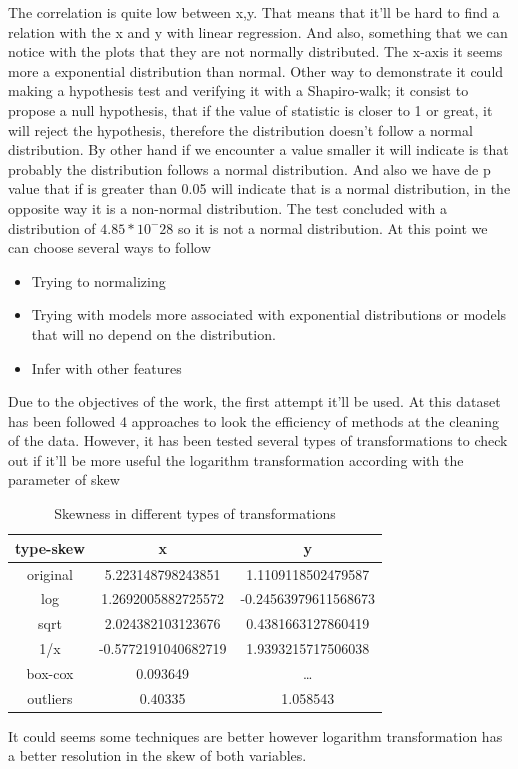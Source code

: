 \documentclass{article}
\begin{document}
The correlation is quite low between x,y. That means that it'll be hard to find a relation with the x and y with linear regression.
And also, something that we can notice with the plots that they are not normally distributed. The x-axis it seems more a exponential distribution than normal.
Other way to demonstrate it could making a hypothesis test and verifying it with a Shapiro-walk; it consist to propose a null hypothesis, that if the value of statistic is closer to 1 or great, it will reject the hypothesis, therefore the distribution doesn't follow a normal distribution. By other hand if we encounter a value smaller it will indicate is that probably the distribution follows a normal distribution. And also we have de p value that if is greater than 0.05 will indicate that is a normal distribution, in the opposite way it is a non-normal distribution.
The test concluded with a distribution of  $4.85*10^-28$ so it is not a normal distribution.
At this point we can choose several ways to follow
\begin{itemize}
  \item Trying to normalizing
  \item Trying with models more associated with exponential distributions or models that will no depend on the distribution.
  \item Infer with other features
\end{itemize} 
Due to the objectives of the work, the first attempt it'll be used.
At this dataset has been followed 4 approaches to look the efficiency of methods at the cleaning of the data.
However, it has been tested several types of transformations to check out if it'll be more useful the logarithm transformation according with the parameter of skew 
\begin{table}[H]
\begin{center}
  \begin{tabular}{|c|c|c|}
    \hline
     type-skew & x & y  \\ \hline
     original& 5.223148798243851&1.1109118502479587\\
     log&1.2692005882725572&-0.24563979611568673\\
     sqrt&2.024382103123676&0.4381663127860419\\
     1/x&-0.5772191040682719&1.9393215717506038\\
     box-cox&0.093649&\dots\\
     outliers&0.40335&1.058543\\
      \hline
  \end{tabular}
\end{center}
\caption{Skewness in different types of transformations}
\end{table}
It could seems some techniques are better however logarithm transformation has a better resolution in the skew of both variables.    
\end{document}
